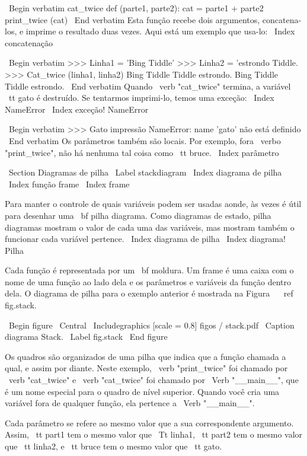 \documentclass[10pt]{book}
\begin{document}
{\ Begin {verbatim}
cat_twice def (parte1, parte2):
    cat = parte1 + parte2
    print_twice (cat)
\ End {verbatim}
%
Esta função recebe dois argumentos, concatena-los, e imprime
o resultado duas vezes. Aqui está um exemplo que usa-lo:
\ Index {concatenação}

\ Begin {verbatim}
>>> Linha1 = 'Bing Tiddle'
>>> Linha2 = 'estrondo Tiddle.
>>> Cat_twice (linha1, linha2)
Bing Tiddle Tiddle estrondo.
Bing Tiddle Tiddle estrondo.
\ End {verbatim}
%
Quando \ verb "cat_twice" termina, a variável {\ tt gato}
é destruído. Se tentarmos imprimi-lo, temos uma exceção:
\ Index {} NameError
\ Index {exceção! NameError}

\ Begin {verbatim}
>>> Gato impressão
NameError: name 'gato' não está definido
\ End {verbatim}
%
Os parâmetros também são locais.
Por exemplo, fora \ verbo "print_twice", não há nenhuma
tal coisa como {\ tt bruce}.
\ Index {parâmetro}


\ Section {Diagramas de pilha}
\ Label {} stackdiagram
\ Index {diagrama de pilha}
\ Index {função frame}
\ Index {frame}

Para manter o controle de quais variáveis ​​podem ser usadas aonde, às vezes é
útil para desenhar uma {\ bf pilha diagrama}. Como diagramas de estado, pilha
diagramas mostram o valor de cada uma das variáveis, mas mostram também o
funcionar cada variável pertence.
\ Index {diagrama de pilha}
\ Index {diagrama! Pilha}

Cada função é representada por um {\ bf moldura}. Um frame é uma caixa
com o nome de uma função
ao lado dela e os parâmetros e variáveis ​​da função dentro dela.
O diagrama de pilha para o
exemplo anterior é mostrada na Figura ~ \ ref {fig.stack}.

\ Begin {figure}
\ Central
{\ Includegraphics [scale = 0.8] {figos / stack.pdf}}
\ Caption {diagrama Stack.}
\ Label {} fig.stack
\ End {figure}


Os quadros são organizados de uma pilha que indica que a função
chamada a qual, e assim por diante. Neste exemplo, \ verb "print_twice"
foi chamado por \ verb "cat_twice" e \ verb "cat_twice" foi chamado por 
\ Verb "__main__", que é um nome especial para o quadro de nível superior. Quando
você cria uma variável fora de qualquer função, ela pertence a 
\ Verb "__main__".

Cada parâmetro se refere ao mesmo valor que a sua correspondente
argumento. Assim, {\ tt part1} tem o mesmo valor que
{\ Tt linha1}, {\ tt part2} tem o mesmo valor que {\ tt linha2},
e {\ tt bruce} tem o mesmo valor que {\ tt gato}.

}
\end{document}
